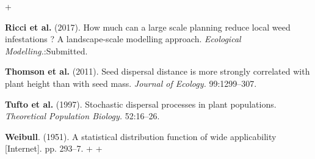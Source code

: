 +\documentclass[12pt]{article}
\begin{document}
\hypertarget{ref-Ricci2017}{}
\textbf{Ricci et al.} (2017). How much can a large scale planning reduce
local weed infestations ? A landscape-scale modelling approach.
\emph{Ecological Modelling.}:Submitted.

\hypertarget{ref-Thomson2011}{}
\textbf{Thomson et al.} (2011). Seed dispersal distance is more strongly
correlated with plant height than with seed mass. \emph{Journal of
Ecology.} 99:1299--307.

\hypertarget{ref-Tufto1997}{}
\textbf{Tufto et al.} (1997). Stochastic dispersal processes in plant
populations. \emph{Theoretical Population Biology.} 52:16--26.

\hypertarget{ref-Weibull1951}{}
\textbf{Weibull}. (1951). A statistical distribution function of wide
applicability {[}Internet{]}. pp. 293--7.
 +
 +
\end{document}
